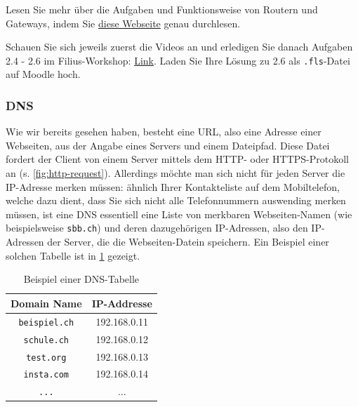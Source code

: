 \begin{myexercise}
Lesen Sie mehr über die Aufgaben und Funktionsweise von Routern und Gateways, indem Sie \href{https://inf-schule.de/rechnernetze/filius/vernetzungrechnernetze/konzept_router}{diese Webseite} genau durchlesen.
\end{myexercise}

\begin{mysubmission}
Schauen Sie sich jeweils zuerst die Videos an und erledigen Sie danach Aufgaben 2.4 - 2.6 im Filius-Workshop: \href{https://informatik.mygymer.ch/base/?page=network/2-filius/4-client-server/}{Link}. Laden Sie Ihre Lösung zu 2.6 als \texttt{.fls}-Datei auf Moodle hoch.
\end{mysubmission}


\subsubsection{DNS}
Wie wir bereits gesehen haben, besteht eine \gls{URL}, also eine Adresse einer Webseiten, aus der Angabe eines Servers und einem Dateipfad. Diese Datei fordert der Client von einem Server mittels dem \gls{HTTP}- oder \gls{HTTPS}-Protokoll an (s. \cref{fig:http-request}). Allerdings möchte man sich nicht für jeden Server die IP-Adresse merken müssen: ähnlich Ihrer Kontakteliste auf dem Mobiltelefon, welche dazu dient, dass Sie sich nicht alle Telefonnummern auswending merken müssen, ist eine \gls{DNS} essentiell eine Liste von merkbaren Webseiten-Namen (wie beispielsweise \texttt{sbb.ch}) und deren dazugehörigen \gls{IP}-Adressen, also den \gls{IP}-Adressen der Server, die die Webseiten-Datein speichern. Ein Beispiel einer solchen Tabelle ist in \cref{tab:dnsEntries} gezeigt. 

\begin{table}[H]
\centering
\begin{tabular}{c|c}
\textbf{Domain Name} & \textbf{IP-Addresse} \\
\midrule\midrule
\texttt{beispiel.ch} & 192.168.0.11 \\
\midrule
\texttt{schule.ch} & 192.168.0.12 \\
\midrule
\texttt{test.org} & 192.168.0.13 \\
\midrule
\texttt{insta.com} & 192.168.0.14 \\
\midrule
\texttt{...} & ... \\
\end{tabular}
\caption{Beispiel einer \gls{DNS}-Tabelle}
\label{tab:dnsEntries}
\end{table}

